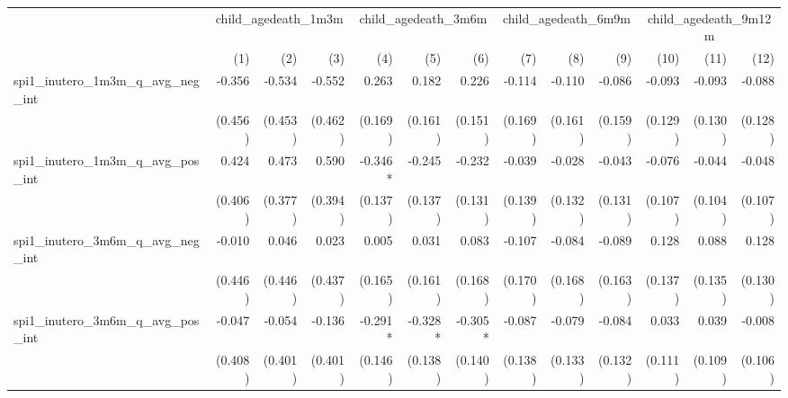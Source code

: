 \begin{tabular}{lrrrrrrrrrrrr}
\toprule
                                            &  \multicolumn{3}{c}{child\_agedeath\_1m3m} &  \multicolumn{3}{c}{child\_agedeath\_3m6m} &  \multicolumn{3}{c}{child\_agedeath\_6m9m} & \multicolumn{3}{c}{child\_agedeath\_9m12m} \\ 
\cmidrule(lr){2-4} \cmidrule(lr){5-7} \cmidrule(lr){8-10} \cmidrule(lr){11-13} 
                                            &          (1) &          (2) &          (3) &          (4) &          (5) &          (6) &          (7) &          (8) &          (9) &         (10) &         (11) &         (12) \\ 
\midrule
spi1\_inutero\_1m3m\_q\_avg\_neg\_int       &       -0.356 &       -0.534 &       -0.552 &        0.263 &        0.182 &        0.226 &       -0.114 &       -0.110 &       -0.086 &       -0.093 &       -0.093 &       -0.088 \\ 
                                            &      (0.456) &      (0.453) &      (0.462) &      (0.169) &      (0.161) &      (0.151) &      (0.169) &      (0.161) &      (0.159) &      (0.129) &      (0.130) &      (0.128) \\ 
spi1\_inutero\_1m3m\_q\_avg\_pos\_int       &        0.424 &        0.473 &        0.590 &      -0.346* &       -0.245 &       -0.232 &       -0.039 &       -0.028 &       -0.043 &       -0.076 &       -0.044 &       -0.048 \\ 
                                            &      (0.406) &      (0.377) &      (0.394) &      (0.137) &      (0.137) &      (0.131) &      (0.139) &      (0.132) &      (0.131) &      (0.107) &      (0.104) &      (0.107) \\ 
spi1\_inutero\_3m6m\_q\_avg\_neg\_int       &       -0.010 &        0.046 &        0.023 &        0.005 &        0.031 &        0.083 &       -0.107 &       -0.084 &       -0.089 &        0.128 &        0.088 &        0.128 \\ 
                                            &      (0.446) &      (0.446) &      (0.437) &      (0.165) &      (0.161) &      (0.168) &      (0.170) &      (0.168) &      (0.163) &      (0.137) &      (0.135) &      (0.130) \\ 
spi1\_inutero\_3m6m\_q\_avg\_pos\_int       &       -0.047 &       -0.054 &       -0.136 &      -0.291* &      -0.328* &      -0.305* &       -0.087 &       -0.079 &       -0.084 &        0.033 &        0.039 &       -0.008 \\ 
                                            &      (0.408) &      (0.401) &      (0.401) &      (0.146) &      (0.138) &      (0.140) &      (0.138) &      (0.133) &      (0.132) &      (0.111) &      (0.109) &      (0.106) \\ 

\end{tabular}
